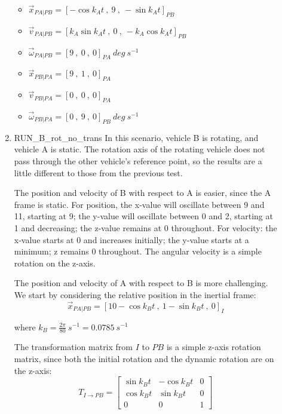 \begin{description}
\begin{enumerate}
    \begin{itemize}
    \item $\vec x_{PA|PB} = [-\cos k_A t\ ,\ 9\ ,\ -\sin k_A t]_{PB}$
    \item $\vec v_{PA|PB} = [k_A \sin k_A t\ ,\ 0\ ,\ -k_A \cos k_A t]_{PB}$
    \item $\vec \omega_{PA|PB} = [9\ ,\ 0\ ,\ 0]_{PA}\ deg\ s^{-1}$
    \item $\vec x_{PB|PA} = [9\ ,\ 1\ ,\ 0]_{PA}$
    \item $\vec v_{PB|PA} = [0\ ,\ 0\ ,\ 0]_{PA}$
    \item $\vec \omega_{PB|PA} = [0\ ,\ 9\ ,\ 0]_{PB}\ deg\ s^{-1}$
   \end{itemize}

 \item RUN\_B\_rot\_no\_trans \newline
 In this scenario, vehicle B is rotating, and vehicle A is static.  The rotation axis of the rotating vehicle does not pass through the other vehicle's reference point, so the results are a little different to those from the previous test.
 
 The position and velocity of B with respect to A is easier, since the A frame is static.  For position, the x-value will oscillate between 9 and 11, starting at 9;  the y-value will oscillate between 0 and 2, starting at 1 and decreasing;  the z-value remains at 0 throughout.  For velocity:  the x-value starts at 0 and increases initially; the y-value starts at a minimum; z remains 0 throughout.  The angular velocity is a simple rotation on the z-axis.
 
 The position and velocity of A with respect to B is more challenging.  We start by considering the relative position in the inertial frame:
 \begin{equation*}
  \vec x_{PA|PB} = [10 - \cos k_B t\ ,\ 1 - \sin k_B t\ ,\ 0]_{I}
 \end{equation*}
 
 where $k_B = \frac{2 \pi}{80}\ s^{-1} = 0.0785\ s^{-1}$


 The transformation matrix from $I$ to $PB$ is a simple z-axis rotation matrix, since both the initial rotation and the dynamic rotation are on the z-axis:
  \begin{equation}
  T_{I\rightarrow PB} =\begin{bmatrix} \sin k_B t & -\cos k_B t & 0 \\ \cos k_B t & \sin k_B t & 0 \\ 0 & 0 & 1 \end{bmatrix}
 \end{equation}\label{eqn:rel_verif_TIPB}
 

\end{enumerate}
\end{description}

